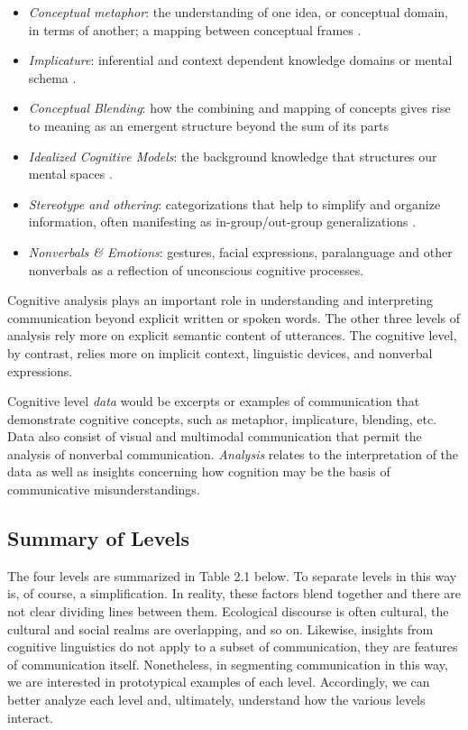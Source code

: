 \begin{itemize}
    \item \textit{Conceptual metaphor}: the understanding of one idea, or conceptual domain, in terms of another; a mapping between conceptual frames \citep{Lakoff1980a}. 
    \item \textit{Implicature}: inferential and context dependent knowledge domains or mental schema \citep{Grice1975}.
    \item \textit{Conceptual Blending}: how the combining and mapping of concepts gives rise to meaning as an emergent structure beyond the sum of its parts \citep[403]{Evans2006a}
    \item \textit{Idealized Cognitive Models}: the background knowledge that structures our mental spaces \citep{Lakoff1987}.
    \item \textit{Stereotype and othering}: categorizations that help to simplify and organize information, often manifesting as in-group/out-group generalizations \citep{Tajfel1981}.
    \item \textit{Nonverbals \& Emotions}: gestures, facial expressions, paralanguage and other nonverbals as a reflection of unconscious cognitive processes. 
\end{itemize}

Cognitive analysis plays an important role in understanding and interpreting communication beyond explicit written or spoken words. The other three levels of analysis rely more on explicit semantic content of utterances. The cognitive level, by contrast, relies more on implicit context, linguistic devices, and nonverbal expressions.

Cognitive level \textit{data} would be excerpts or examples of communication that demonstrate cognitive concepts, such as metaphor, implicature, blending, etc. Data also consist of visual and multimodal communication that permit the analysis of nonverbal communication. \textit{Analysis} relates to the interpretation of the data as well as insights concerning how cognition may be the basis of communicative misunderstandings.   

\subsection{Summary of Levels}

The four levels are summarized in Table 2.1 below. To separate levels in this way is, of course, a simplification. In reality, these factors blend together and there are not clear dividing lines between them. Ecological discourse is often cultural, the cultural and social realms are overlapping, and so on. Likewise, insights from cognitive linguistics do not apply to a subset of communication, they are features of communication itself. Nonetheless, in segmenting communication in this way, we are interested in prototypical examples of each level. Accordingly, we can better analyze each level and, ultimately, understand how the various levels interact.

